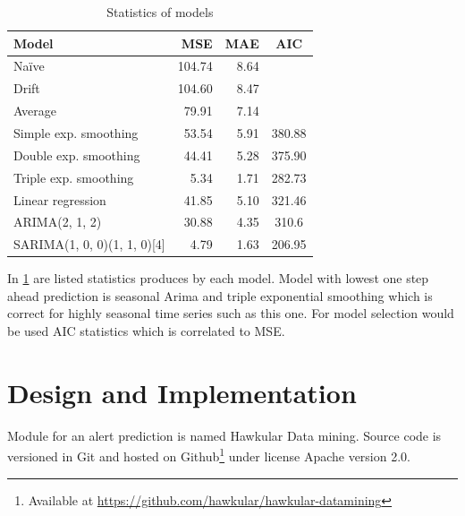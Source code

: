     \begin{table}[h]
        \begin{center}
            \begin{tabular}{l|r|r|c}
                    \textbf{Model} & \textbf{MSE} & \textbf{MAE} & \textbf{AIC} \\ \hline \hline
                    Na\"{i}ve & 104.74 & 8.64 & \\
                    Drift & 104.60 & 8.47 & \\
                    Average & 79.91 & 7.14 & \\ \hline
                    Simple exp. smoothing & 53.54 & 5.91 & 380.88 \\
                    Double exp. smoothing & 44.41 & 5.28 & 375.90 \\
                    Triple exp. smoothing & 5.34 & 1.71 & 282.73 \\ \hline
                    Linear regression & 41.85 & 5.10 & 321.46 \\ \hline
                    ARIMA(2, 1, 2) & 30.88 & 4.35 & 310.6 \\
                    SARIMA(1, 0, 0)(1, 1, 0)[4] & 4.79 & 1.63 & 206.95 \\
            \end{tabular}
            \caption{Statistics of models}
            \label{tab:models-stat}
        \end{center}
    \end{table}

    In \ref{tab:models-stat} are listed statistics produces by each model. Model with lowest one step ahead prediction
    is seasonal Arima and triple exponential smoothing which is correct for highly seasonal time series such as this
    one. For model selection would be used AIC statistics which is correlated to MSE.

\chapter{Design and Implementation}
Module for an alert prediction is named Hawkular Data mining. Source code is versioned in Git and
hosted on Github\footnote{Available at \url{https://github.com/hawkular/hawkular-datamining}} under license
Apache version 2.0.


